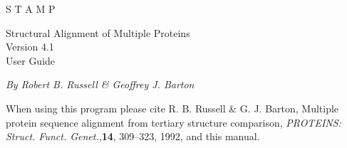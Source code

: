 
\newcommand{\al}{\mbox{$\alpha$~}}  
\newcommand{\be}{\mbox{$\beta$~}}  
\newcommand{\albe}{\mbox{$\alpha/\beta$~}}
  
\newcommand{\tten}{\mbox{${\rm 3_{10}}$~}}  
\newcommand{\ea}{\mbox{\em et al. \/}}  
\newcommand{\Cal}{\mbox{${\rm C}_{\alpha}$~}}  
\newcommand{\Cbe}{\mbox{${\rm C}_{\beta}$~}}
\newcommand{\ii}{\mbox{$i$~}}
\newcommand{\jj}{\mbox{$j$~}}
\newcommand{\ip}{\mbox{$i^{\prime}$~}}
\newcommand{\jp}{\mbox{$j^{\prime}$~}}
\newcommand{\sdp}{\setlength{\baselineskip}{18truept}}
\newcommand{\ssp}{\setlength{\baselineskip}{13.6truept}}
  



\begin{titlepage}
\begin{center}
\begin{bf}
\begin{Huge}
S T A M P\\
\end{Huge}
\begin{Large}
Structural Alignment of Multiple Proteins \\
Version 4.1\\
User Guide\\
\end{Large}
\end{bf}
\vskip 0.25in

{\em By Robert B. Russell \& Geoffrey J. Barton}\\
\end{center}
\vskip 0.25in

\noindent
When using this program please cite R. B. Russell \& G. J.  Barton, 
Multiple protein sequence alignment from tertiary structure 
comparison, {\em PROTEINS: Struct. Funct. Genet.},{\bf 14}, 
309--323, 1992, and this manual.\\

\vskip 0.25in


\end{titlepage}
